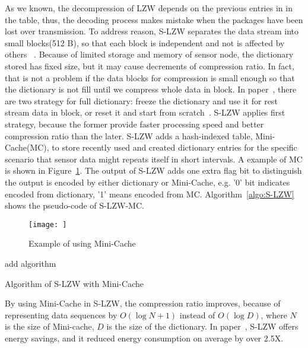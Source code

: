 As we known, the decompression of LZW depends on the previous entries in in the
table, thus, the decoding process makes mistake when the packages have been lost
over transmission. To address reason, S-LZW separates the data stream into small
blocks(512 B), so that each block is independent and not is affected by
others~\cite{sadler2006data} . Because of limited storage and memory of sensor
node, the dictionary stored has fixed size, but it may cause decrements of
compression ratio. In fact, that is not a problem if the data blocks for
compression is small enough so that the dictionary is not fill until we compress
whole data in block. In paper~\cite{sadler2006data}, there are two strategy for
full dictionary: freeze the dictionary and use it for rest stream data in block,
or reset it and start from scratch~\cite{sadler2006data}. S-LZW applies first
strategy, because the former provide faster processing speed and better
compression ratio than the later. S-LZW adds a hash-indexed table,
Mini-Cache(MC), to store recently used and created dictionary entries for the
specific scenario that sensor data might repeats itself in short intervals. A
example of MC is shown in Figure~\ref{fig:MC}. The output of S-LZW adds one
extra flag bit to distinguish the output is encoded by either dictionary or
Mini-Cache, e.g. '0' bit indicates encoded from dictionary, '1' means encoded
from MC. Algorithm~\ref{algo:S-LZW} shows the pseudo-code of S-LZW-MC.

\begin{figure}
    \centering
    \texttt{[image: ]}
    \caption{Example of using Mini-Cache}
    \label{fig:MC}
\end{figure}

\begin{algorithm}
\begin{algorithmic}[1]

\State add algorithm

\end{algorithmic}
\caption{Algorithm of S-LZW with Mini-Cache}
\label{algo:S-LZW}
\end{algorithm}

By using Mini-Cache in S-LZW, the compression ratio improves, because of
representing data sequences by $O(\log N + 1)$ instead of $O(\log D)$, where $N$
is the size of Mini-cache, $D$ is the size of the dictionary. In
paper~\cite{sadler2006data}, S-LZW offers energy savings, and it reduced energy
consumption on average by over 2.5X.


